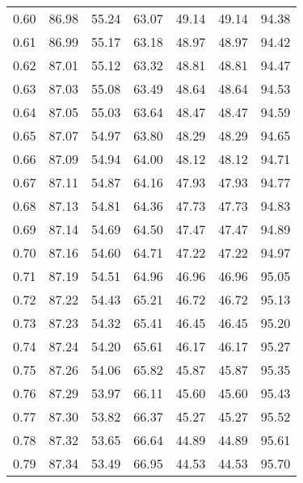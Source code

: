 \begin{tabular}{|c|c|c|c|c|c|c|}
      0.60 &     86.98 &     55.24 &      63.07 &   49.14 &      49.14 &         94.38 \\
      0.61 &     86.99 &     55.17 &      63.18 &   48.97 &      48.97 &         94.42 \\
      0.62 &     87.01 &     55.12 &      63.32 &   48.81 &      48.81 &         94.47 \\
      0.63 &     87.03 &     55.08 &      63.49 &   48.64 &      48.64 &         94.53 \\
      0.64 &     87.05 &     55.03 &      63.64 &   48.47 &      48.47 &         94.59 \\
      0.65 &     87.07 &     54.97 &      63.80 &   48.29 &      48.29 &         94.65 \\
      0.66 &     87.09 &     54.94 &      64.00 &   48.12 &      48.12 &         94.71 \\
      0.67 &     87.11 &     54.87 &      64.16 &   47.93 &      47.93 &         94.77 \\
      0.68 &     87.13 &     54.81 &      64.36 &   47.73 &      47.73 &         94.83 \\
      0.69 &     87.14 &     54.69 &      64.50 &   47.47 &      47.47 &         94.89 \\
      0.70 &     87.16 &     54.60 &      64.71 &   47.22 &      47.22 &         94.97 \\
      0.71 &     87.19 &     54.51 &      64.96 &   46.96 &      46.96 &         95.05 \\
      0.72 &     87.22 &     54.43 &      65.21 &   46.72 &      46.72 &         95.13 \\
      0.73 &     87.23 &     54.32 &      65.41 &   46.45 &      46.45 &         95.20 \\
      0.74 &     87.24 &     54.20 &      65.61 &   46.17 &      46.17 &         95.27 \\
      0.75 &     87.26 &     54.06 &      65.82 &   45.87 &      45.87 &         95.35 \\
      0.76 &     87.29 &     53.97 &      66.11 &   45.60 &      45.60 &         95.43 \\
      0.77 &     87.30 &     53.82 &      66.37 &   45.27 &      45.27 &         95.52 \\
      0.78 &     87.32 &     53.65 &      66.64 &   44.89 &      44.89 &         95.61 \\
      0.79 &     87.34 &     53.49 &      66.95 &   44.53 &      44.53 &         95.70 \\

\end{tabular}

